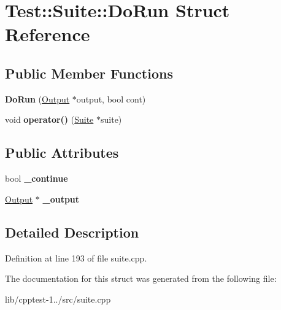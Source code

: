 \hypertarget{struct_test_1_1_suite_1_1_do_run}{}\section{Test\+:\+:Suite\+:\+:Do\+Run Struct Reference}
\label{struct_test_1_1_suite_1_1_do_run}
\subsection*{Public Member Functions}
\begin{DoxyCompactItemize}
\item 
{\bfseries Do\+Run} (\hyperlink{class_test_1_1_output}{Output} $\ast$output, bool cont)\hypertarget{struct_test_1_1_suite_1_1_do_run_ae4fa291dd6956a7aa1507bde2d2596f7}{}\label{struct_test_1_1_suite_1_1_do_run_ae4fa291dd6956a7aa1507bde2d2596f7}

\item 
void {\bfseries operator()} (\hyperlink{class_test_1_1_suite}{Suite} $\ast$suite)\hypertarget{struct_test_1_1_suite_1_1_do_run_ae1196082bc99fed5dbf7c31608950fec}{}\label{struct_test_1_1_suite_1_1_do_run_ae1196082bc99fed5dbf7c31608950fec}

\end{DoxyCompactItemize}
\subsection*{Public Attributes}
\begin{DoxyCompactItemize}
\item 
bool {\bfseries \+\_\+continue}\hypertarget{struct_test_1_1_suite_1_1_do_run_aec0de4a2fe5c782f036f26b82a4eeba4}{}\label{struct_test_1_1_suite_1_1_do_run_aec0de4a2fe5c782f036f26b82a4eeba4}

\item 
\hyperlink{class_test_1_1_output}{Output} $\ast$ {\bfseries \+\_\+output}\hypertarget{struct_test_1_1_suite_1_1_do_run_aeff5d2f886719ca02ff7cbab9548d8ad}{}\label{struct_test_1_1_suite_1_1_do_run_aeff5d2f886719ca02ff7cbab9548d8ad}

\end{DoxyCompactItemize}


\subsection{Detailed Description}


Definition at line 193 of file suite.\+cpp.



The documentation for this struct was generated from the following file\+:\begin{DoxyCompactItemize}
\item 
lib/cpptest-\/1../src/suite.\+cpp\end{DoxyCompactItemize}

